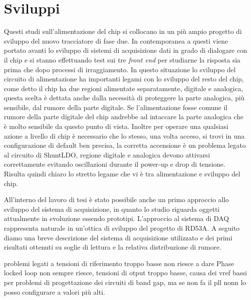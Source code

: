 \section{Sviluppi}
Questi studi sull'alimentazione del chip si collocano in un più ampio progetto di sviluppo del nuovo tracciatore di fase due. In contemporanea a questi viene portato avanti lo sviluppo di sistemi di acquisizione dati in grado di dialogare con il chip e si stanno effettuando test sui tre \textit{front end} per studiarne la risposta sia prima che dopo processi di irraggiamento. 
In questo situazione lo sviluppo del circuito di alimentazione ha importanti legami con lo sviluppo del resto del chip, come detto il chip ha due regioni alimentate separatamente, digitale e analogica, questa scelta è dettata anche dalla necessità di proteggere la parte analogica, più sensibile, dal rumore della parte digitale. Se l'alimentazione fosse comune il rumore della parte digitale del chip andrebbe ad intaccare la parte analogica che è molto sensibile da questo punto di vista. 
Inoltre per operare una qualsiasi azione a livello di chip è necessario che lo stesso, una volta acceso, si trovi in una configurazione di default ben precisa, la corretta accensione è un problema legato al circuito di ShuntLDO, regione digitale e analogica devono attivarsi correttamente evitando oscillazioni durante il power-up e drop di tensione. 
Risulta quindi chiaro lo stretto legame che vi è tra alimentazione e sviluppo del chip. 

All'interno del lavoro di tesi è stato possibile anche un primo approccio allo sviluppo del sistema di acquisizione, in quanto lo studio riguarda oggetti attualmente in evoluzione essendo prototipi. L'approccio al sistema di DAQ rappresenta naturale in un'ottica di sviluppo del progetto di RD53A. A seguito diamo una breve descrizione del sistema di acquisizione utilizzato e dei primi risultati ottenuti su soglie di lettura e la relativa distribuzione di rumore. 



problemi legati a tensioni di riferimento troppo basse non riesce a dare Phase locked loop non sempre riesce, tensioni di otput troppo basse, causa dei vref bassi per problemi di progettazione dei circuiti di band gap, ma se non fa il pll nonn lo posso configurare a valori più alti.

